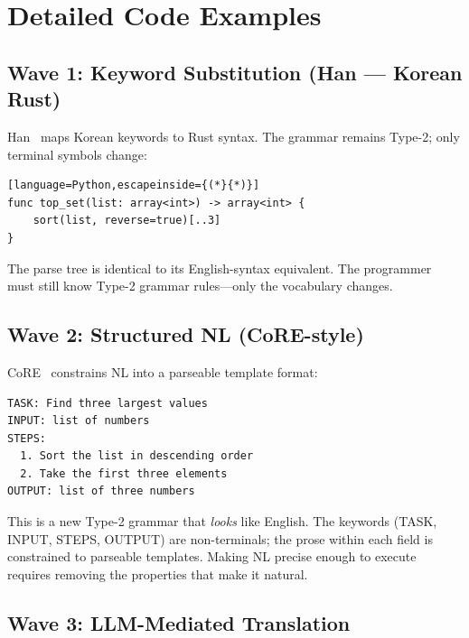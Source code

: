 \documentclass[11pt]{article}
\theoremstyle{definition}
\begin{document}

\appendix

\section{Detailed Code Examples}\label{app:code}

\subsection{Wave 1: Keyword Substitution (Han --- Korean Rust)}

Han~\cite{han2025} maps Korean keywords to Rust syntax. The grammar remains Type-2; only terminal symbols change:

\begin{lstlisting}[language=Python,escapeinside={(*}{*)}]
func top_set(list: array<int>) -> array<int> {
    sort(list, reverse=true)[..3]
}
\end{lstlisting}

The parse tree is identical to its English-syntax equivalent. The programmer must still know Type-2 grammar rules---only the vocabulary changes.

\subsection{Wave 2: Structured NL (CoRE-style)}

CoRE~\cite{core2025} constrains NL into a parseable template format:

\begin{lstlisting}
TASK: Find three largest values
INPUT: list of numbers
STEPS:
  1. Sort the list in descending order
  2. Take the first three elements
OUTPUT: list of three numbers
\end{lstlisting}

This is a new Type-2 grammar that \emph{looks} like English. The keywords (TASK, INPUT, STEPS, OUTPUT) are non-terminals; the prose within each field is constrained to parseable templates. Making NL precise enough to execute requires removing the properties that make it natural.

\subsection{Wave 3: LLM-Mediated Translation}
\end{document}

